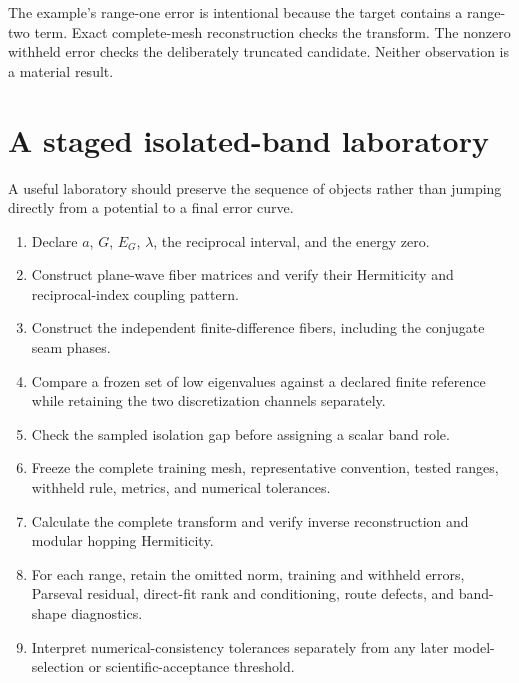 The example's range-one error is intentional because the target contains a
range-two term. Exact complete-mesh reconstruction checks the transform. The
nonzero withheld error checks the deliberately truncated candidate. Neither
observation is a material result.


\section{A staged isolated-band laboratory}

A useful laboratory should preserve the sequence of objects rather than jumping
directly from a potential to a final error curve.

\begin{enumerate}
  \item Declare $a$, $G$, $E_G$, $\lambda$, the reciprocal interval, and the
        energy zero.
  \item Construct plane-wave fiber matrices and verify their Hermiticity and
        reciprocal-index coupling pattern.
  \item Construct the independent finite-difference fibers, including the
        conjugate seam phases.
  \item Compare a frozen set of low eigenvalues against a declared finite
        reference while retaining the two discretization channels separately.
  \item Check the sampled isolation gap before assigning a scalar band role.
  \item Freeze the complete training mesh, representative convention, tested
        ranges, withheld rule, metrics, and numerical tolerances.
  \item Calculate the complete transform and verify inverse reconstruction and
        modular hopping Hermiticity.
  \item For each range, retain the omitted norm, training and withheld errors,
        Parseval residual, direct-fit rank and conditioning, route defects, and
        band-shape diagnostics.
  \item Interpret numerical-consistency tolerances separately from any later
        model-selection or scientific-acceptance threshold.
\end{enumerate}

